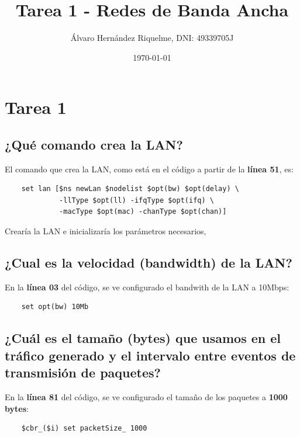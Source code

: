 \documentclass{article}
\title{Tarea 1 - Redes de Banda Ancha}
\author{Álvaro Hernández Riquelme, DNI: 49339705J}
\date{\today}
\begin{document}

\maketitle
\tableofcontents
\newpage



\section{Tarea 1}

\subsection{¿Qué comando crea la LAN?}

El comando que crea la LAN, como está en el código a partir de la \textbf{línea 51}, es:

\begin{verbatim}
    set lan [$ns newLan $nodelist $opt(bw) $opt(delay) \
             -llType $opt(ll) -ifqType $opt(ifq) \
             -macType $opt(mac) -chanType $opt(chan)]
\end{verbatim}

Crearía la LAN e inicializaría los parámetros necesarios,

\subsection{¿Cual es la velocidad (bandwidth) de la LAN?}

En la \textbf{línea 03} del código, se ve configurado el bandwith de la LAN a 10Mbps:

\begin{verbatim}
    set opt(bw) 10Mb
\end{verbatim}

\subsection{¿Cuál es el tamaño (bytes) que usamos en el tráfico generado y el intervalo entre eventos de transmisión de paquetes?}

En la \textbf{línea 81} del código, se ve configurado el tamaño de los paquetes a \textbf{1000 bytes}:

\begin{verbatim}
    $cbr_($i) set packetSize_ 1000
\end{verbatim}
\end{document}
